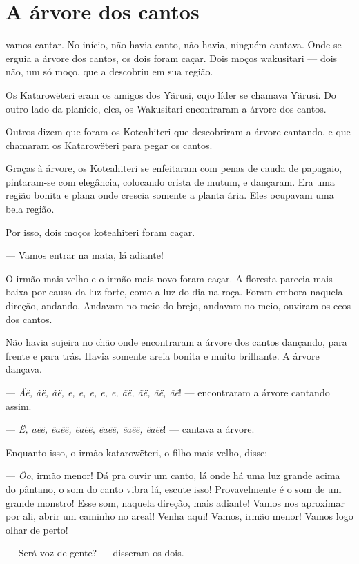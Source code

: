 \chapter{A árvore dos cantos}

 vamos cantar. No início, não havia canto, não havia, ninguém
cantava. Onde se erguia a árvore dos cantos, os dois foram caçar. Dois
moços wakusitari --- dois não, um só moço, que a descobriu em sua região.

Os Katarowëteri eram os amigos dos Yãrusi, cujo líder se chamava Yãrusi.
Do outro lado da planície, eles, os Wakusitari encontraram a árvore dos
cantos. 

Outros dizem que foram os Koteahiteri que descobriram a árvore cantando,
e que chamaram os Katarowëteri para pegar os cantos. 

Graças à árvore, os Koteahiteri se enfeitaram com penas de cauda de
papagaio, pintaram-se com elegância, colocando crista de mutum, e
dançaram. Era uma região bonita e plana onde crescia somente a planta
ária. Eles ocupavam uma bela região. 

Por isso, dois moços koteahiteri foram caçar. 

--- Vamos entrar na mata, lá adiante! 

O irmão mais velho e o irmão mais novo foram caçar. A floresta parecia
mais baixa por causa da luz forte, como a luz do dia na roça. Foram
embora naquela direção, andando. Andavam no meio do brejo, andavam no
meio, ouviram os ecos dos cantos. 

Não havia sujeira no chão onde encontraram a árvore dos cantos dançando,
para frente e para trás. Havia somente areia bonita e muito brilhante. A
árvore dançava. 

--- \textit{Ãë, ãë, ãë, e, e, e, e, e, ãë, ãë, ãë, ãë}! --- encontraram a árvore
cantando assim. 

--- \textit{Ë, aëë, ëaëë, ëaëë, ëaëë, ëaëë, ëaëë}! --- cantava a árvore. 

Enquanto isso, o irmão katarowëteri, o filho mais velho, disse: 

--- \textit{Õo}, irmão menor! Dá pra ouvir um canto, lá onde há uma luz grande
acima do pântano, o som do canto vibra lá, escute isso! Provavelmente é
o som de um grande monstro! Esse som, naquela direção, mais adiante!
Vamos nos aproximar por ali, abrir um caminho no areal! Venha aqui!
Vamos, irmão menor! Vamos logo olhar de perto! 

--- Será voz de gente? --- disseram os dois. 

